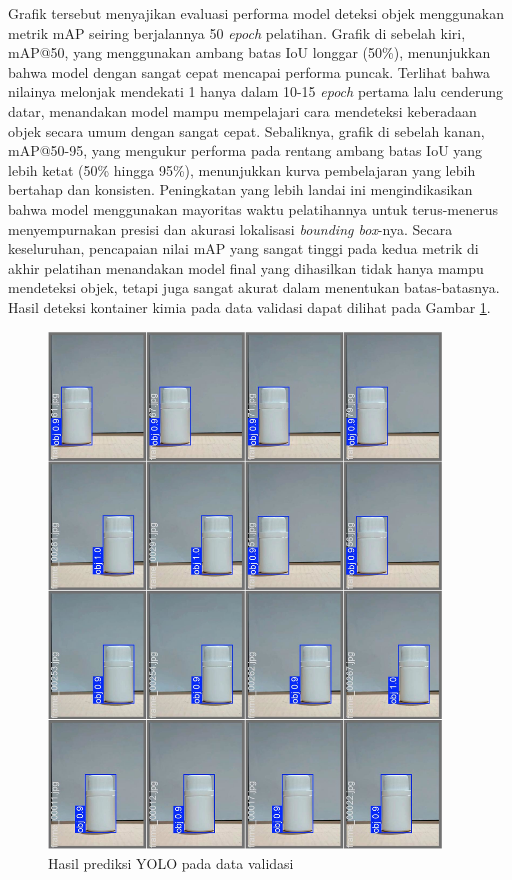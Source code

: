 Grafik tersebut menyajikan evaluasi performa model deteksi objek
menggunakan metrik mAP seiring berjalannya
50 \textit{epoch} pelatihan. Grafik di sebelah kiri, mAP@50, yang menggunakan
ambang batas IoU longgar (50\%), menunjukkan bahwa model dengan
sangat cepat mencapai performa puncak. Terlihat bahwa nilainya
melonjak mendekati 1 hanya dalam 10-15 \textit{epoch} pertama lalu
cenderung datar, menandakan model mampu mempelajari cara mendeteksi
keberadaan objek secara umum dengan sangat cepat. Sebaliknya, grafik
di sebelah kanan, mAP@50-95, yang mengukur performa pada rentang
ambang batas IoU yang lebih ketat (50\% hingga 95\%), menunjukkan
kurva pembelajaran yang lebih bertahap dan konsisten. Peningkatan
yang lebih landai ini mengindikasikan bahwa model menggunakan
mayoritas waktu pelatihannya untuk terus-menerus menyempurnakan
presisi dan akurasi lokalisasi \textit{bounding box}-nya. Secara keseluruhan,
pencapaian nilai mAP yang sangat tinggi pada kedua metrik di akhir
pelatihan menandakan model final yang dihasilkan tidak hanya mampu
mendeteksi objek, tetapi juga sangat akurat dalam menentukan
batas-batasnya. Hasil deteksi kontainer kimia pada data validasi
dapat dilihat pada Gambar \ref{fig:yolo-validasi}.

\begin{figure}[H]
  \centering
  \includegraphics[width=0.93\textwidth]{gambar/yolo_validasi.jpg}
  \caption{Hasil prediksi YOLO pada data validasi}
  \label{fig:yolo-validasi}
\end{figure}
\vspace{-1em}

